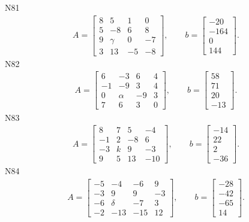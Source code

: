 \documentclass[11pt]{report}
\begin{document}
N81
\begin{align*}
 A = \left[\begin{matrix}8 & 5 & 1 & 0\\5 & -8 & 6 & 8\\9 & \gamma & 0 & -7\\3 & 13 & -5 & -8\end{matrix}\right],
\qquad b = \left[\begin{matrix}-20\\-164\\0\\144\end{matrix}\right]. 
 \end{align*}
N82
\begin{align*}
 A = \left[\begin{matrix}6 & -3 & 6 & 4\\-1 & -9 & 3 & 4\\0 & \alpha & -9 & 3\\7 & 6 & 3 & 0\end{matrix}\right],
\qquad b = \left[\begin{matrix}58\\71\\20\\-13\end{matrix}\right]. 
 \end{align*}
N83
\begin{align*}
 A = \left[\begin{matrix}8 & 7 & 5 & -4\\-1 & 2 & -8 & 6\\-3 & k & 9 & -3\\9 & 5 & 13 & -10\end{matrix}\right],
\qquad b = \left[\begin{matrix}-14\\22\\2\\-36\end{matrix}\right]. 
 \end{align*}
N84
\begin{align*}
 A = \left[\begin{matrix}-5 & -4 & -6 & 9\\-3 & 9 & 9 & -3\\-6 & \delta & -7 & 3\\-2 & -13 & -15 & 12\end{matrix}\right],
\qquad b = \left[\begin{matrix}-28\\-42\\-65\\14\end{matrix}\right]. 
 \end{align*}
\end{document}
